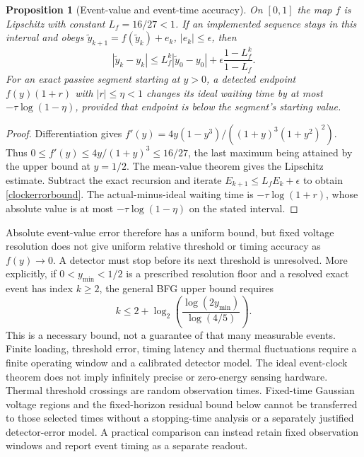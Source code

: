 \documentclass[11pt,letterpaper]{article}
\newtheorem{proposition}[theorem]{Proposition}
\theoremstyle{definition}
\numberwithin{equation}{section}
\begin{document}
\begin{proposition}[Event-value and event-time accuracy]\label{clockerrors}
On $[0,1]$ the map $f$ is Lipschitz with constant $L_f=16/27<1$. If an implemented sequence stays in this interval and obeys $\widetilde y_{k+1}=f(\widetilde y_k)+e_k$, $|e_k|\leq\epsilon$, then
\begin{equation}\label{clockerrorbound}
|\widetilde y_k-y_k|\leq L_f^k|\widetilde y_0-y_0|+\epsilon\frac{1-L_f^k}{1-L_f}.
\end{equation}
For an exact passive segment starting at $y>0$, a detected endpoint $f(y)(1+r)$ with $|r|\leq\eta<1$ changes its ideal waiting time by at most $-\tau\log(1-\eta)$, provided that endpoint is below the segment's starting value.
\end{proposition}
\begin{proof}
Differentiation gives $f'(y)=4y(1-y^3)/((1+y)^3(1+y^2)^2)$. Thus $0\leq f'(y)\leq4y/(1+y)^3\leq16/27$, the last maximum being attained by the upper bound at $y=1/2$. The mean-value theorem gives the Lipschitz estimate. Subtract the exact recursion and iterate $E_{k+1}\leq L_fE_k+\epsilon$ to obtain \eqref{clockerrorbound}. The actual-minus-ideal waiting time is $-\tau\log(1+r)$, whose absolute value is at most $-\tau\log(1-\eta)$ on the stated interval.
\end{proof}
Absolute event-value error therefore has a uniform bound, but fixed voltage resolution does not give uniform relative threshold or timing accuracy as $f(y)\to0$. A detector must stop before its next threshold is unresolved. More explicitly, if $0<y_{\min}<1/2$ is a prescribed resolution floor and a resolved exact event has index $k\geq2$, the general BFG upper bound requires
\begin{equation}\label{clockbudget}
k\leq2+\log_2\!\left(\frac{\log(2y_{\min})}{\log(4/5)}\right).
\end{equation}
This is a necessary bound, not a guarantee of that many measurable events. Finite loading, threshold error, timing latency and thermal fluctuations require a finite operating window and a calibrated detector model. The ideal event-clock theorem does not imply infinitely precise or zero-energy sensing hardware. Thermal threshold crossings are random observation times. Fixed-time Gaussian voltage regions and the fixed-horizon residual bound below cannot be transferred to those selected times without a stopping-time analysis or a separately justified detector-error model. A practical comparison can instead retain fixed observation windows and report event timing as a separate readout.
\end{document}
